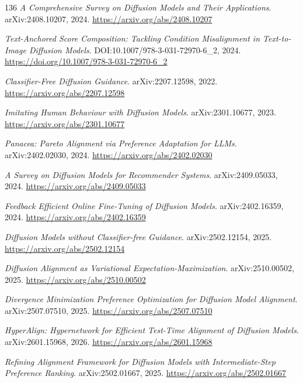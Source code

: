 \documentclass[11pt,a4paper]{article}
\begin{document}
\begin{thebibliography}{136}
\newblock \emph{A Comprehensive Survey on Diffusion Models and Their Applications}.
\newblock arXiv:2408.10207, 2024.
\newblock \url{https://arxiv.org/abs/2408.10207}

\newblock \emph{Text-Anchored Score Composition: Tackling Condition Misalignment in Text-to-Image Diffusion Models}.
\newblock DOI:10.1007/978-3-031-72970-6\_2, 2024.
\newblock \url{https://doi.org/10.1007/978-3-031-72970-6_2}

\newblock \emph{Classifier-Free Diffusion Guidance}.
\newblock arXiv:2207.12598, 2022.
\newblock \url{https://arxiv.org/abs/2207.12598}

\newblock \emph{Imitating Human Behaviour with Diffusion Models}.
\newblock arXiv:2301.10677, 2023.
\newblock \url{https://arxiv.org/abs/2301.10677}

\newblock \emph{Panacea: Pareto Alignment via Preference Adaptation for LLMs}.
\newblock arXiv:2402.02030, 2024.
\newblock \url{https://arxiv.org/abs/2402.02030}

\newblock \emph{A Survey on Diffusion Models for Recommender Systems}.
\newblock arXiv:2409.05033, 2024.
\newblock \url{https://arxiv.org/abs/2409.05033}

\newblock \emph{Feedback Efficient Online Fine-Tuning of Diffusion Models}.
\newblock arXiv:2402.16359, 2024.
\newblock \url{https://arxiv.org/abs/2402.16359}

\newblock \emph{Diffusion Models without Classifier-free Guidance}.
\newblock arXiv:2502.12154, 2025.
\newblock \url{https://arxiv.org/abs/2502.12154}

\newblock \emph{Diffusion Alignment as Variational Expectation-Maximization}.
\newblock arXiv:2510.00502, 2025.
\newblock \url{https://arxiv.org/abs/2510.00502}

\newblock \emph{Divergence Minimization Preference Optimization for Diffusion Model Alignment}.
\newblock arXiv:2507.07510, 2025.
\newblock \url{https://arxiv.org/abs/2507.07510}

\newblock \emph{HyperAlign: Hypernetwork for Efficient Test-Time Alignment of Diffusion Models}.
\newblock arXiv:2601.15968, 2026.
\newblock \url{https://arxiv.org/abs/2601.15968}

\newblock \emph{Refining Alignment Framework for Diffusion Models with Intermediate-Step Preference Ranking}.
\newblock arXiv:2502.01667, 2025.
\newblock \url{https://arxiv.org/abs/2502.01667}


\end{thebibliography}
\end{document}
